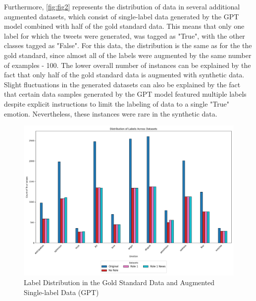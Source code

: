 \documentclass[manuscript]{clv3}
\begin{document}
Furthermore, \autoref{fig:fig2} represents the distribution of data in several additional augmented datasets, which consist of single-label data generated by the GPT model combined with half of the gold standard data. This means that only one label for which the tweets were generated, was tagged as "True", with the other classes tagged as "False". For this data, the distribution is the same as for the the gold standard, since almost all of the labels were augmented by the same number of examples - 100. The lower overall number of instances can be explained by the fact that only half of the gold standard data is augmented with synthetic data. Slight fluctuations in the generated datasets can also be explained by the fact that certain data samples generated by the GPT model featured multiple labels despite explicit instructions to limit the labeling of data to a single "True" emotion. Nevertheless, these instances were rare in the synthetic data.

\begin{figure}
    \centering
    \includegraphics[width=1\linewidth]{single_label_distribution_comparison.png}
    \caption{Label Distribution in the Gold Standard Data and Augmented Single-label Data (GPT)}
    \label{fig:fig2}
\end{figure}
\end{document}
